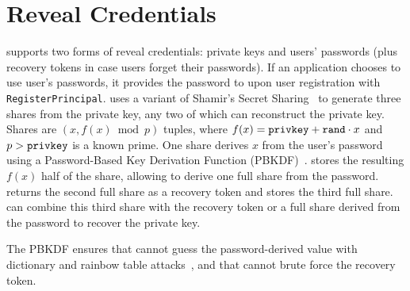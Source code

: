 %

\section{Reveal Credentials}
\label{s:impl:cred}
%
\sys supports two forms of reveal credentials: private keys and users' passwords
(plus recovery tokens in case users forget their passwords).
%
If an application chooses to use user's passwords, it provides the password to
\sys upon user registration with \texttt{RegisterPrincipal}.
%
\sys uses a variant of Shamir's Secret Sharing~\cite{secretsharing} to generate
three shares from the private key, any two of which can reconstruct the private
key.
%
Shares are $(x, f(x) \bmod p)$ tuples, where $f(x) = \texttt{{privkey}} + \texttt{{rand}} \cdot
x$ and $p > \texttt{{privkey}}$ is a known prime.
%
One share derives $x$ from the user's password using a Password-Based Key
Derivation Function (PBKDF)~\cite{pbkdf-rfc}.
%
\sys stores the resulting $f(x)$ half of the share, allowing \sys to derive one
full share from the password.
%
%
\sys returns the second full share as a recovery token and stores the third full
share.
%
\sys can combine this third share with the recovery token
or a full share derived from the password to recover the
private key.
%

The PBKDF ensures that \sys cannot guess the password-derived value with
dictionary and rainbow table attacks~\cite{pbkdf}, and that \sys cannot brute force
the recovery token.
%
%

%
%

